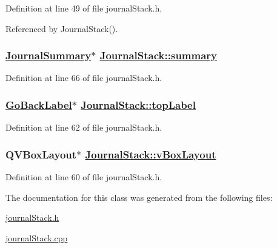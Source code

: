 Definition at line 49 of file journal\-Stack.h.

Referenced by Journal\-Stack().\hypertarget{classJournalStack_r13}{
\subsubsection[summary]{\setlength{\rightskip}{0pt plus 5cm}\hyperlink{classJournalSummary}{Journal\-Summary}$\ast$ \hyperlink{classJournalStack_r13}{Journal\-Stack::summary}}}
\label{classJournalStack_r13}


Definition at line 66 of file journal\-Stack.h.\hypertarget{classJournalStack_r9}{
\subsubsection[topLabel]{\setlength{\rightskip}{0pt plus 5cm}\hyperlink{classGoBackLabel}{Go\-Back\-Label}$\ast$ \hyperlink{classJournalStack_r9}{Journal\-Stack::top\-Label}}}
\label{classJournalStack_r9}


Definition at line 62 of file journal\-Stack.h.\hypertarget{classJournalStack_r7}{
\subsubsection[vBoxLayout]{\setlength{\rightskip}{0pt plus 5cm}QVBox\-Layout$\ast$ \hyperlink{classJournalStack_r7}{Journal\-Stack::v\-Box\-Layout}}}
\label{classJournalStack_r7}


Definition at line 60 of file journal\-Stack.h.

The documentation for this class was generated from the following files:\begin{CompactItemize}
\item 
\hyperlink{journalStack_8h}{journal\-Stack.h}\item 
\hyperlink{journalStack_8cpp}{journal\-Stack.cpp}\end{CompactItemize}
